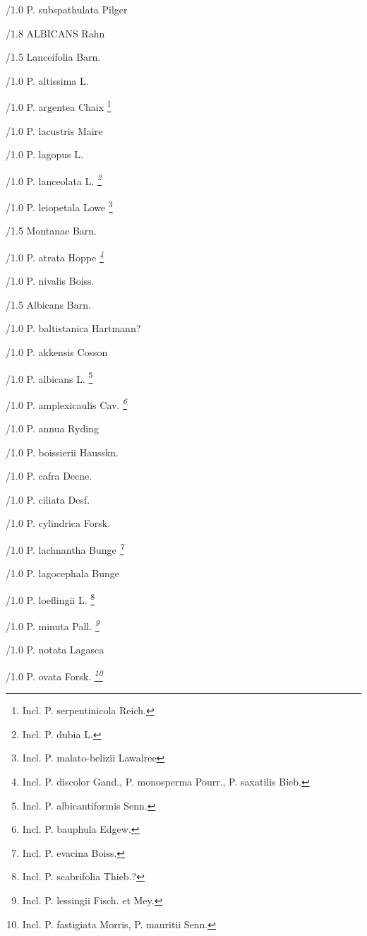 \documentclass{article}
\begin{document}
\begin{classif}{1.0}
        /1.0 {P. subspathulata} Pilger

/1.8 ALBICANS Rahn

/1.5 Lanceifolia Barn.

        /1.0 {P. altissima} L.

        /1.0 {P. argentea} Chaix \footnote{Incl. \KURN P.
        serpentinicola Reich.}

        /1.0 {P. lacustris} Maire

        /1.0 {P. lagopus} L.

        /1.0 {P. lanceolata} L. \sl \footnote{Incl. \KURN P.
        dubia L.}

        /1.0 {P. leiopetala} Lowe \footnote{Incl. \KURN P.
        malato-belizii Lawalree}

/1.5 Montanae Barn.

        /1.0 {P. atrata} Hoppe \sl \footnote{Incl. \KURN P.
        discolor Gand., \KURN P. monosperma Pourr., \KURN P.
        saxatilis Bieb.}

        /1.0 {P. nivalis} Boiss.

/1.5 Albicans Barn.

        /1.0 {P. baltistanica} Hartmann?

        /1.0 {P. akkensis} Cosson

        /1.0 {P. albicans} L. \footnote{Incl. \KURN P.
        albicantiformis Senn.}

        /1.0 {P. amplexicaulis} Cav. \sl \footnote{Incl. \KURN
        P. bauphula Edgew.}

        /1.0 {P. annua} Ryding

        /1.0 {P. boissierii} Hausskn.

        /1.0 {P. cafra} Decne.

        /1.0 {P. ciliata} Desf.

        /1.0 {P. cylindrica} Forsk.

        /1.0 {P. lachnantha} Bunge \sl \footnote{Incl. \KURN P.
        evacina Boiss.}

        /1.0 {P. lagocephala} Bunge

        /1.0 {P. loeflingii} L. \footnote{Incl. \KURN P.
        scabrifolia Thieb.?}

        /1.0 {P. minuta} Pall. \sl \footnote{Incl. \KURN P.
        lessingii Fisch. et Mey.}

        /1.0 {P. notata} Lagasca

        /1.0 {P. ovata} Forsk. \sl \footnote{Incl. \KURN P.
        fastigiata Morris, \KURN P. mauritii Senn.}


\end{classif}
\end{document}
